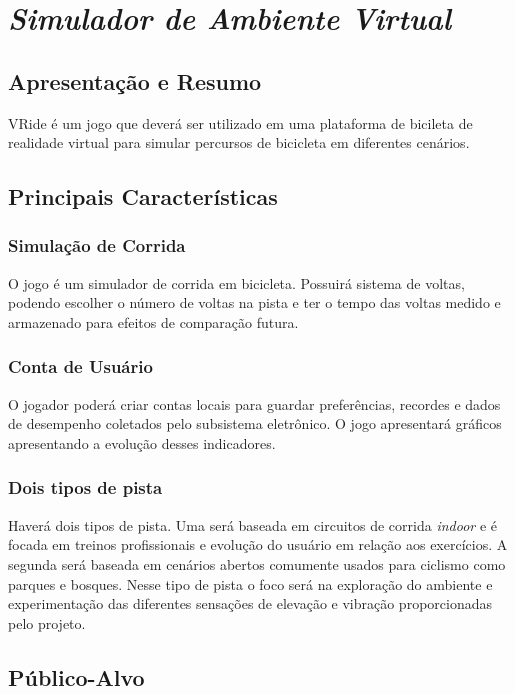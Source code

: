 \section{\textit{Simulador de Ambiente Virtual}}

\subsection{Apresentação e Resumo}

VRide é um jogo que deverá ser utilizado em uma plataforma de bicileta de realidade virtual para simular percursos de bicicleta em diferentes cenários.

\subsection{Principais Características}

\subsubsection{Simulação de Corrida}

O jogo é um simulador de corrida em bicicleta. Possuirá sistema de voltas, podendo escolher o número de voltas na pista e ter o tempo das voltas medido e armazenado para efeitos de comparação futura.

\subsubsection{Conta de Usuário}

O jogador poderá criar contas locais para guardar preferências, recordes e dados de desempenho coletados pelo subsistema eletrônico. O jogo apresentará gráficos apresentando a evolução desses indicadores.

\subsubsection{Dois tipos de pista}

Haverá dois tipos de pista. Uma será baseada em circuitos de corrida \textit{indoor} e é focada em treinos profissionais e evolução do usuário em relação aos exercícios. A segunda será baseada em cenários abertos comumente usados para ciclismo como parques e bosques. Nesse tipo de pista o foco será na exploração do ambiente e experimentação das diferentes sensações de elevação e vibração proporcionadas pelo projeto.

\subsection{Público-Alvo}

